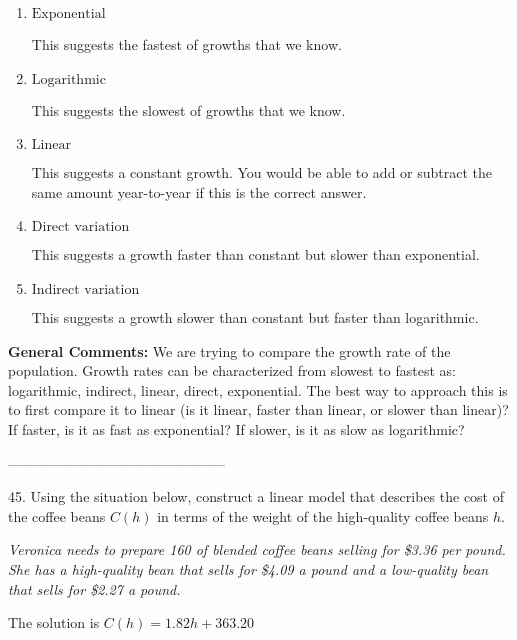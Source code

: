 \documentclass{article}[14pt]
\begin{document}
\begin{enumerate}[label=\Alph*.] 
\item $ \text{Exponential} $ 

 This suggests the fastest of growths that we know. 
\item $ \text{Logarithmic} $ 

 This suggests the slowest of growths that we know. 
\item $ \text{Linear} $ 

 This suggests a constant growth. You would be able to add or subtract the same amount year-to-year if this is the correct answer. 
\item $ \text{Direct variation} $ 

 This suggests a growth faster than constant but slower than exponential. 
\item $ \text{Indirect variation} $ 

 This suggests a growth slower than constant but faster than logarithmic. 
\end{enumerate} 
 
\textbf{General Comments:} We are trying to compare the growth rate of the population. Growth rates can be characterized from slowest to fastest as: logarithmic, indirect, linear, direct, exponential. The best way to approach this is to first compare it to linear (is it linear, faster than linear, or slower than linear)? If faster, is it as fast as exponential? If slower, is it as slow as logarithmic?

-----------------------------------------------

45. Using the situation below, construct a linear model that describes the cost of the coffee beans $C(h)$ in terms of the weight of the high-quality coffee beans $h$.
 \begin{center} \textit{Veronica needs to prepare 160 of blended coffee beans selling for \$3.36 per pound. She has a high-quality bean that sells for \$4.09 a pound and a low-quality bean that sells for \$2.27 a pound.} \end{center} 
The solution is $ C(h) = 1.82 h + 363.20 $ 
\end{document}
